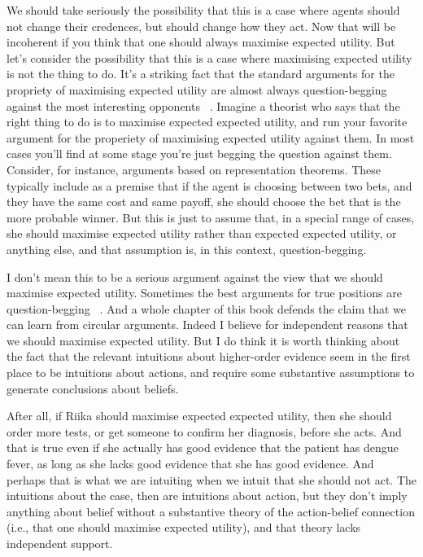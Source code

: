 We should take seriously the possibility that this is a case where agents should not change their credences, but should change how they act. Now that will be incoherent if you think that one should always maximise expected utility. But let's consider the possibility that this is a case where maximising expected utility is not the thing to do. It's a striking fact that the standard arguments for the propriety of maximising expected utility are almost always question-begging against the most interesting opponents ~\citep{Maher1997, Weatherson1999}. Imagine a theorist who says that the right thing to do is to maximise expected expected utility, and run your favorite argument for the properiety of maximising expected utility against them. In most cases you'll find at some stage you're just begging the question against them. Consider, for instance, arguments based on representation theorems. These typically include as a premise that if the agent is choosing between two bets, and they have the same cost and same payoff, she should choose the bet that is the more probable winner. But this is just to assume that, in a special range of cases, she should maximise expected utility rather than expected expected utility, or anything else, and that assumption is, in this context, question-begging.

I don't mean this to be a serious argument against the view that we should maximise expected utility. Sometimes the best arguments for true positions are question-begging ~\citep{Lewis1982c}. And a whole chapter of this book defends the claim that we can learn from circular arguments. Indeed I believe for independent reasons that we should maximise expected utility. But I do think it is worth thinking about the fact that the relevant intuitions about higher-order evidence seem in the first place to be intuitions about actions, and require some substantive assumptions to generate conclusions about beliefs.

After all, if \gls{Riika} should maximise expected expected utility, then she should order more tests, or get someone to confirm her diagnosis, before she acts. And that is true even if she actually has good evidence that the patient has dengue fever, as long as she lacks good evidence that she has good evidence. And perhaps that is what we are intuiting when we intuit that she should not act. The intuitions about the case, then are intuitions about action, but they don't imply anything about belief without a substantive theory of the action-belief connection (i.e., that one should maximise expected utility), and that theory lacks independent support.

